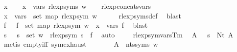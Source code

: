 \begin{isabellebody}
\ x\isanewline
\ \ \isamarkupfalse%
\ {\isachardoublequoteopen}x\ {\isasymin}\ vars\ {\isacharparenleft}{\kern0pt}rlexp{\isacharunderscore}{\kern0pt}syms\ w{\isacharparenright}{\kern0pt}{\isachardoublequoteclose}\isanewline
\ \ \isamarkupfalse%
\ rlexp{\isacharunderscore}{\kern0pt}concats{\isacharunderscore}{\kern0pt}vars\ \isamarkupfalse%
\ {\isachardoublequoteopen}x\ {\isasymin}\ {\isasymUnion}{\isacharparenleft}{\kern0pt}vars\ {\isacharbackquote}{\kern0pt}\ set\ {\isacharparenleft}{\kern0pt}map\ rlexp{\isacharunderscore}{\kern0pt}sym\ w{\isacharparenright}{\kern0pt}{\isacharparenright}{\kern0pt}{\isachardoublequoteclose}\isanewline
\ \ \ \ \isamarkupfalse%
\ rlexp{\isacharunderscore}{\kern0pt}syms{\isacharunderscore}{\kern0pt}def\ \isamarkupfalse%
\ blast\isanewline
\ \ \isamarkupfalse%
\ \isamarkupfalse%
\ f\ \ {\isacharasterisk}{\kern0pt}{\isacharcolon}{\kern0pt}\ {\isachardoublequoteopen}f\ {\isasymin}\ set\ {\isacharparenleft}{\kern0pt}map\ rlexp{\isacharunderscore}{\kern0pt}sym\ w{\isacharparenright}{\kern0pt}\ {\isasymand}\ x\ {\isasymin}\ vars\ f{\isachardoublequoteclose}\ \isamarkupfalse%
\ blast\isanewline
\ \ \isamarkupfalse%
\ \isamarkupfalse%
\ s\ \ {\isacharasterisk}{\kern0pt}{\isacharasterisk}{\kern0pt}{\isacharcolon}{\kern0pt}\ {\isachardoublequoteopen}s\ {\isasymin}\ set\ w\ {\isasymand}\ rlexp{\isacharunderscore}{\kern0pt}sym\ s\ {\isacharequal}{\kern0pt}\ f{\isachardoublequoteclose}\ \isamarkupfalse%
\ auto\isanewline
\ \ \isamarkupfalse%
\ {\isacharasterisk}{\kern0pt}\ rlexp{\isacharunderscore}{\kern0pt}sym{\isacharunderscore}{\kern0pt}vars{\isacharunderscore}{\kern0pt}Tm\ \isamarkupfalse%
\ A\ \ {\isacharasterisk}{\kern0pt}{\isacharasterisk}{\kern0pt}{\isacharasterisk}{\kern0pt}{\isacharcolon}{\kern0pt}\ {\isachardoublequoteopen}s\ {\isacharequal}{\kern0pt}\ Nt\ A{\isachardoublequoteclose}\ \isamarkupfalse%
\ {\isacharparenleft}{\kern0pt}metis\ empty{\isacharunderscore}{\kern0pt}iff\ sym{\isachardot}{\kern0pt}exhaust{\isacharparenright}{\kern0pt}\isanewline
\ \ \isamarkupfalse%
\ {\isacharasterisk}{\kern0pt}{\isacharasterisk}{\kern0pt}\ \isamarkupfalse%
\ {\isacharasterisk}{\kern0pt}{\isacharasterisk}{\kern0pt}{\isacharasterisk}{\kern0pt}{\isacharasterisk}{\kern0pt}{\isacharcolon}{\kern0pt}\ {\isachardoublequoteopen}A\ {\isasymin}\ nts{\isacharunderscore}{\kern0pt}syms\ w{\isachardoublequoteclose}\ \isamarkupfalse%

\end{isabellebody}
